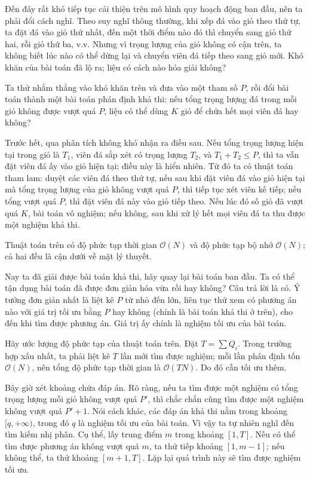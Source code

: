\documentclass[11pt]{article}
\newcommand{\Oh}{\mathcal{O}}
\begin{document}
Đến đây rất khó tiếp tục cải thiện trên mô hình quy hoạch động ban đầu, nên ta
phải đổi cách nghĩ. Theo suy nghĩ thông thường, khi xếp đá vào giỏ theo thứ
tự, ta đặt đá vào giỏ thứ nhất, đến một thời điểm nào đó thì chuyển sang giỏ
thứ hai, rồi giỏ thứ ba, v.v. Nhưng vì trọng lượng của giỏ không có cận trên,
ta không biết lúc nào có thể dừng lại và chuyển viên đá tiếp theo sang giỏ
mới. Khó khăn của bài toán đã lộ ra; liệu có cách nào hóa giải không?

Ta thử nhắm thẳng vào khó khăn trên và đưa vào một tham số $P$, rồi đổi bài
toán thành một bài toán phán định khả thi: nếu tổng trọng lượng đá trong mỗi
giỏ không được vượt quá $P$, liệu có thể dùng $K$ giỏ để chứa hết mọi viên đá
hay không?

Trước hết, qua phân tích không khó nhận ra điều sau. Nếu tổng trọng lượng hiện
tại trong giỏ là $T_1$, viên đá sắp xét có trọng lượng $T_2$, và
$T_1+T_2\le P$, thì ta vẫn đặt viên đá ấy vào giỏ hiện tại; điều này là hiển
nhiên. Từ đó ta có thuật toán tham lam: duyệt các viên đá theo thứ tự, nếu sau
khi đặt viên đá vào giỏ hiện tại mà tổng trọng lượng của giỏ không vượt quá
$P$, thì tiếp tục xét viên kế tiếp; nếu tổng vượt quá $P$, thì đặt viên đá này
vào giỏ tiếp theo. Nếu lúc đó số giỏ đã vượt quá $K$, bài toán vô nghiệm; nếu
không, sau khi xử lý hết mọi viên đá ta thu được một nghiệm khả thi.

Thuật toán trên có độ phức tạp thời gian $\Oh(N)$ và độ phức tạp bộ nhớ
$\Oh(N)$; cả hai đều là cận dưới về mặt lý thuyết.

Nay ta đã giải được bài toán khả thi, hãy quay lại bài toán ban đầu. Ta có thể
tận dụng bài toán đã được đơn giản hóa vừa rồi hay không? Câu trả lời là có.
Ý tưởng đơn giản nhất là liệt kê $P$ từ nhỏ đến lớn, liên tục thử xem có
phương án nào với giá trị tối ưu bằng $P$ hay không (chính là bài toán khả thi
ở trên), cho đến khi tìm được phương án. Giá trị ấy chính là nghiệm tối ưu của
bài toán.

Hãy ước lượng độ phức tạp của thuật toán trên. Đặt $T=\sum Q_i$. Trong trường
hợp xấu nhất, ta phải liệt kê $T$ lần mới tìm được nghiệm; mỗi lần phán định
tốn $\Oh(N)$, nên tổng độ phức tạp thời gian là $\Oh(TN)$. Do đó cần tối ưu
thêm.

Bây giờ xét khoảng chứa đáp án. Rõ ràng, nếu ta tìm được một nghiệm có tổng
trọng lượng mỗi giỏ không vượt quá $P'$, thì chắc chắn cũng tìm được một
nghiệm không vượt quá $P'+1$. Nói cách khác, các đáp án khả thi nằm trong
khoảng $[q,+\infty)$, trong đó $q$ là nghiệm tối ưu của bài toán. Vì vậy ta
tự nhiên nghĩ đến tìm kiếm nhị phân. Cụ thể, lấy trung điểm $m$ trong khoảng
$[1,T]$. Nếu có thể tìm được phương án không vượt quá $m$, ta thử tiếp khoảng
$[1,m-1]$; nếu không thể, ta thử khoảng $[m+1,T]$. Lặp lại quá trình này sẽ
tìm được nghiệm tối ưu.
\end{document}
